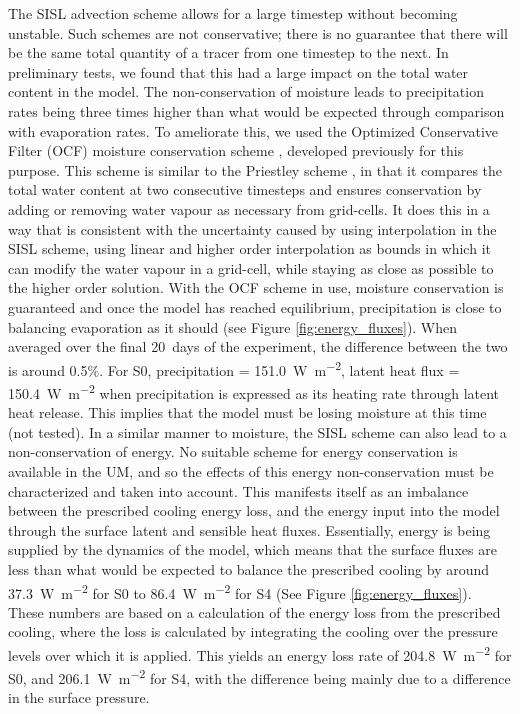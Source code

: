 \documentclass[11pt,a4paper]{article}
\begin{document}
The SISL advection scheme allows for a large timestep without becoming unstable. Such schemes are not conservative; there is no guarantee that there will be the same total quantity of a tracer from one timestep to the next. In preliminary tests, we found that this had a large impact on the total water content in the model. The non-conservation of moisture leads to precipitation rates being three times higher than what would be expected through comparison with evaporation rates. To ameliorate this, we used the Optimized Conservative Filter (OCF) moisture conservation scheme \parencite{zerroukat2015monotonic}, developed previously for this purpose. This scheme is similar to the Priestley scheme \parencite{priestley1993quasi}, in that it compares the total water content at two consecutive timesteps and ensures conservation by adding or removing water vapour as necessary from grid-cells. It does this in a way that is consistent with the uncertainty caused by using interpolation in the SISL scheme, using linear and higher order interpolation as bounds in which it can modify the water vapour in a grid-cell, while staying as close as possible to the higher order solution. With the OCF scheme in use, moisture conservation is guaranteed and once the model has reached equilibrium, precipitation is close to balancing evaporation as it should (see Figure \ref{fig:energy_fluxes}). When averaged over the final \SI{20}{days} of the experiment, the difference between the two is around 0.5\%. For S0, precipitation = \SI{151.0}{W.m^{-2}}, latent heat flux = \SI{150.4}{W.m^{-2}} when precipitation is expressed as its heating rate through latent heat release. This implies that the model must be losing moisture at this time (not tested).
 In a similar manner to moisture, the SISL scheme can also lead to a non-conservation of energy. No suitable scheme for energy conservation is available in the UM, and so the effects of this energy non-conservation must be characterized and taken into account. This manifests itself as an imbalance between the prescribed cooling energy loss, and the energy input into the model through the surface latent and sensible heat fluxes. Essentially, energy is being supplied by the dynamics of the model, which means that the surface fluxes are less than what would be expected to balance the prescribed cooling by around \SI{37.3}{W.m^{-2}} for S0 to \SI{86.4}{W.m^{-2}} for S4 (See Figure \ref{fig:energy_fluxes}). These numbers are based on a calculation of the energy loss from the prescribed cooling, where the loss is calculated by integrating the cooling over the pressure levels over which it is applied. This yields an energy loss rate of \SI{204.8}{W.m^{-2}} for S0, and \SI{206.1}{W.m^{-2}} for S4, with the difference being mainly due to a difference in the surface pressure.
\end{document}
